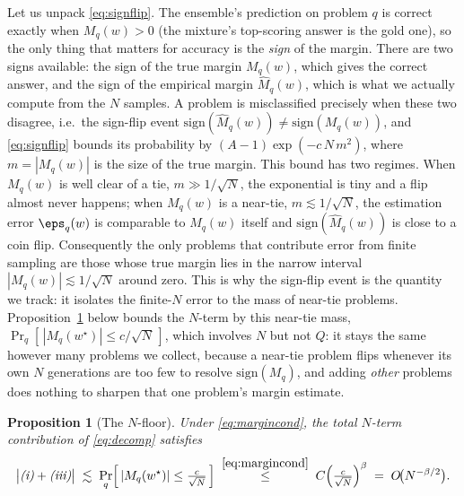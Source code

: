 \documentclass{article} %
\newtheorem{proposition}[theorem]{Proposition}
\providecommand{\Mhat}{\widehat{M}}
\providecommand{\wstar}{w^{\star}}
\providecommand{\sign}{\mathrm{sign}}
\begin{document}
\noindent Let us unpack \eqref{eq:signflip}. The ensemble's prediction on
problem $q$ is correct exactly when $M_q(w)>0$ (the mixture's top-scoring answer
is the gold one), so the only thing that matters for accuracy is the \emph{sign}
of the margin. There are two signs available: the sign of the true margin
$M_q(w)$, which gives the correct answer, and the sign of the empirical margin
$\Mhat_q(w)$, which is what we actually compute from the $N$ samples. A problem is
misclassified precisely when these two disagree, i.e.\ the sign-flip event
$\sign(\Mhat_q(w))\ne\sign(M_q(w))$, and \eqref{eq:signflip} bounds its
probability by $(A-1)\exp(-c\,N\,m^2)$, where $m=|M_q(w)|$ is the size of the true
margin. This bound has two regimes. When $M_q(w)$ is well clear of a tie,
$m\gg 1/\sqrt N$, the exponential is tiny and a flip almost never happens; when
$M_q(w)$ is a near-tie, $m\lesssim 1/\sqrt N$, the estimation error $\eps_q(w)$
is comparable to $M_q(w)$ itself and $\sign(\Mhat_q(w))$ is close to a coin flip.
Consequently the only problems that contribute error from finite sampling are
those whose true margin lies in the narrow interval $|M_q(w)|\lesssim 1/\sqrt N$
around zero. This is why the sign-flip event is the quantity we track: it
isolates the finite-$N$ error to the mass of near-tie problems. Proposition~\ref{prop:2}
below bounds the $N$-term by this near-tie mass, $\Pr_q[\,|M_q(\wstar)|\le c/\sqrt N\,]$,
which involves $N$ but not $Q$: it stays the same however many problems we
collect, because a near-tie problem flips whenever its own $N$ generations are
too few to resolve $\sign(M_q)$, and adding \emph{other} problems does nothing to
sharpen that one problem's margin estimate.

\begin{proposition}[The $N$-floor]
\label{prop:2}
Under \eqref{eq:margincond}, the total $N$-term contribution of
\eqref{eq:decomp} satisfies
\begin{equation}
\label{eq:floor}
\big|\text{\emph{(i)}} + \text{\emph{(iii)}}\big|
\;\lesssim\;
\Pr_q\!\Big[\,|M_q(\wstar)|\le \tfrac{c}{\sqrt N}\,\Big]
\;\overset{\eqref{eq:margincond}}{\le}\;
C\Big(\tfrac{c}{\sqrt N}\Big)^{\beta}
\;=\; O\!\big(N^{-\beta/2}\big).
\end{equation}
\end{proposition}
\end{document}

